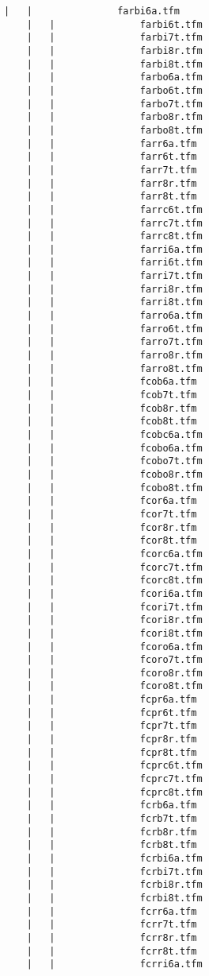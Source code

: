 \begin{lstlisting}[frame=tb, extendedchars=false, breaklines=false, basicstyle=\footnotesize\upshape ,columns=flexible ,keepspaces=true , lineskip={-7.0pt} ]
    |   |               farbi6a.tfm
    |   |               farbi6t.tfm
    |   |               farbi7t.tfm
    |   |               farbi8r.tfm
    |   |               farbi8t.tfm
    |   |               farbo6a.tfm
    |   |               farbo6t.tfm
    |   |               farbo7t.tfm
    |   |               farbo8r.tfm
    |   |               farbo8t.tfm
    |   |               farr6a.tfm
    |   |               farr6t.tfm
    |   |               farr7t.tfm
    |   |               farr8r.tfm
    |   |               farr8t.tfm
    |   |               farrc6t.tfm
    |   |               farrc7t.tfm
    |   |               farrc8t.tfm
    |   |               farri6a.tfm
    |   |               farri6t.tfm
    |   |               farri7t.tfm
    |   |               farri8r.tfm
    |   |               farri8t.tfm
    |   |               farro6a.tfm
    |   |               farro6t.tfm
    |   |               farro7t.tfm
    |   |               farro8r.tfm
    |   |               farro8t.tfm
    |   |               fcob6a.tfm
    |   |               fcob7t.tfm
    |   |               fcob8r.tfm
    |   |               fcob8t.tfm
    |   |               fcobc6a.tfm
    |   |               fcobo6a.tfm
    |   |               fcobo7t.tfm
    |   |               fcobo8r.tfm
    |   |               fcobo8t.tfm
    |   |               fcor6a.tfm
    |   |               fcor7t.tfm
    |   |               fcor8r.tfm
    |   |               fcor8t.tfm
    |   |               fcorc6a.tfm
    |   |               fcorc7t.tfm
    |   |               fcorc8t.tfm
    |   |               fcori6a.tfm
    |   |               fcori7t.tfm
    |   |               fcori8r.tfm
    |   |               fcori8t.tfm
    |   |               fcoro6a.tfm
    |   |               fcoro7t.tfm
    |   |               fcoro8r.tfm
    |   |               fcoro8t.tfm
    |   |               fcpr6a.tfm
    |   |               fcpr6t.tfm
    |   |               fcpr7t.tfm
    |   |               fcpr8r.tfm
    |   |               fcpr8t.tfm
    |   |               fcprc6t.tfm
    |   |               fcprc7t.tfm
    |   |               fcprc8t.tfm
    |   |               fcrb6a.tfm
    |   |               fcrb7t.tfm
    |   |               fcrb8r.tfm
    |   |               fcrb8t.tfm
    |   |               fcrbi6a.tfm
    |   |               fcrbi7t.tfm
    |   |               fcrbi8r.tfm
    |   |               fcrbi8t.tfm
    |   |               fcrr6a.tfm
    |   |               fcrr7t.tfm
    |   |               fcrr8r.tfm
    |   |               fcrr8t.tfm
    |   |               fcrri6a.tfm

\end{lstlisting}
